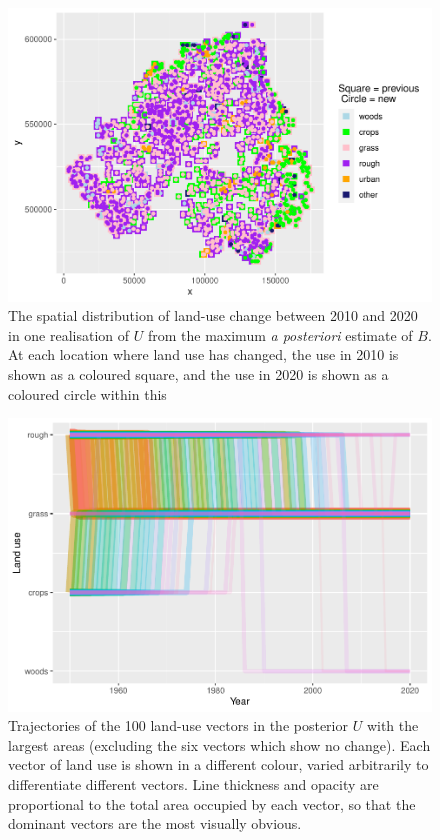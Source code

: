 \documentclass[
]{book}
\begin{document}
\begin{figure}
\centering
\includegraphics{Results_ni_files/figure-latex/plotUd-1.pdf}
\caption{\label{fig:plotUd}The spatial distribution of land-use change between 2010 and 2020 in one realisation of \(U\) from the maximum \emph{a posteriori} estimate of \(B\). At each location where land use has changed, the use in 2010 is shown as a coloured square, and the use in 2020 is shown as a coloured circle within this}
\end{figure}

\begin{figure}
\centering
\includegraphics{Results_ni_files/figure-latex/plotv1-1.pdf}
\caption{\label{fig:plotv1}Trajectories of the 100 land-use vectors in the posterior \(U\) with the largest areas (excluding the six vectors which show no change). Each vector of land use is shown in a different colour, varied arbitrarily to differentiate different vectors. Line thickness and opacity are proportional to the total area occupied by each vector, so that the dominant vectors are the most visually obvious.}
\end{figure}
\end{document}
